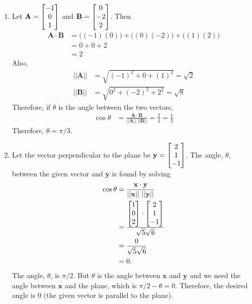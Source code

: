 \begin{enumerate}
\item 
Let $\mathbf{A} = \begin{bmatrix}-1 \\ 0 \\ 1\end{bmatrix}$ and $\mathbf{B} = \begin{bmatrix} 0 \\ -2 \\ 2 \end{bmatrix}$. Then
\begin{align*}
  \mathbf{A} \cdot \mathbf{B} &= \big((-1)(0)\big) + \big((0)(-2)\big) + \big((1)(2)\big)\\
  &= 0 + 0 + 2 \\
  &= 2
\end{align*}
Also,
\begin{align*}
  || \mathbf{A} || &= \sqrt{(-1)^2 + 0 + (1)^2} = \sqrt{2} \\
  || \mathbf{B} || &= \sqrt{0^2 + (-2)^2 + 2^2} = \sqrt{8}
\end{align*}
Therefore, if $\theta$ is the angle between the two vectors, 
\begin{align*}
  \cos\theta &= \frac{ \mathbf{A}\cdot \mathbf{B}}{|| \mathbf{A}|| \ || \mathbf{B}||} = \frac{2}{4} = \frac{1}{2}
\end{align*}
Therefore, $\theta = \pi/3$. 

\item 
Let the vector perpendicular to the plane be $\mathbf{y}= \begin{bmatrix} 2 \\ 1 \\ -1 \end{bmatrix}$. The angle, $\theta$, between the given vector and $\mathbf{y}$ is found by solving
\begin{align*}
  \cos\theta &= \frac{ \mathbf{x}\cdot \mathbf{y}}{|| \mathbf{x}|| \ || \mathbf{y}||} \\
  &= \frac{ \BM 1 \\0 \\ 2 \EM \cdot \BM 2 \\1 \\-1 \EM} {\sqrt{5}\sqrt{6}}\\
    &= \frac{ 0 } {\sqrt{5}\sqrt{6}}\\
    &=0.
\end{align*}
The angle, $\theta$, is $\pi/2$. But $\theta$ is the angle between $\mathbf{x}$ and $\mathbf{y}$ and we need the angle between $\mathbf{x}$ and the plane, which is $\pi/2 - \theta = 0$. Therefore, the desired angle is 0 (the given vector is parallel to the plane). 
\end{enumerate}

